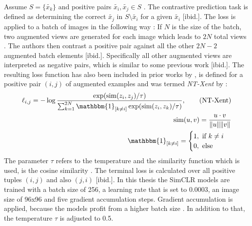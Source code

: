 Assume $S=\{{\tilde{x_k}}\}$ and positive pairs $\tilde{x_i}, \tilde{x_j} \in S$ \citep{Chen2020}.
The contrastive prediction task is defined as determining the correct $\tilde{x_j}$ in $S\setminus \tilde{x_i}$ for a given $\tilde{x_i}$ [ibid.].
The loss is applied to a batch of images in the following way \citep{Chen2020}:
If $N$ is the size of the batch, two augmented views are generated for each image which leads to $2N$ total views \citep{Chen2020}.
The authors then contrast a positive pair against all the other $2N-2$ augmented batch elements [ibid.].
Specifically all other augmented views are interpreted as negative pairs, which is similar to some previous work [ibid.].
The resulting loss function has also been included in prior works by \citep{Sohn2016,Wu2018,Oord2018}, is defined for a positive pair $(i,j)$ of augmented examples and was termed \textit{NT-Xent} by \citep{Chen2017}:
\begin{align}
	\ell_{i,j} = -\log\frac{\exp(\text{sim}(z_i,z_j)/\tau)}{\sum_{k=1}^{2N} \mathbbm{1}_{[k \neq i]}\exp(\text{sim}(z_i,z_k)/\tau)}, \tag{NT-Xent}\\
	\text{sim}(u,v) = \frac{u\cdot v}{\Vert u \Vert \Vert v \Vert} \\
	\mathbbm{1}_{[k \neq i]} = \begin{cases}
		1, \text{ if } k \neq i \\
		0, \text{ else}
	\end{cases}
\end{align}
The parameter $\tau$ refers to the temperature and the similarity function which is used, is the cosine similarity \citep{Chen2020}.
The terminal loss is calculated over all positive tuples $(i,j)$ and also $(j,i)$ [ibid.].
In this thesis the SimCLR models are trained with a batch size of 256, a learning rate that is set to $0.0003$, an image size of 96x96 and five gradient accumulation steps.
Gradient accumulation is applied, because the models profit from a higher batch size \citep{Chen2020}.
In addition to that, the temperature $\tau$ is adjusted to 0.5.
